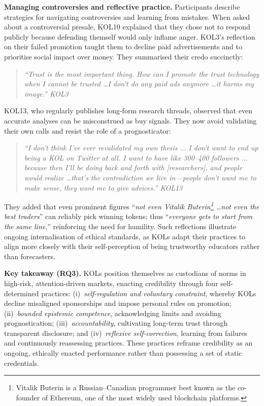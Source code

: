 \noindent\textbf{Managing controversies and reflective practice.} Participants describe strategies for navigating controversies and learning from mistakes.  When asked about a controversial presale, KOL10 explained that they chose not to respond publicly because defending themself would only inflame anger.  KOL3's reflection on their failed promotion taught them to decline paid advertisements and to prioritise social impact over money.  They summarised their credo succinctly:  
\begin{quote}\itshape
``Trust is the most important thing.  How can I promote the trust technology when I cannot be trusted \ldots I don't do any paid ads anymore \ldots it harms my image.''  \textemdash{} KOL3
\end{quote}
KOL13, who regularly publishes long-form research threads, observed that even accurate analyses can be misconstrued as buy signals.  They now avoid validating their own calls and resist the role of a prognosticator:  
\begin{quote}\itshape
``I don't think I've ever revalidated my own thesis $\ldots$ I don't want to end up being a KOL on Twitter at all.  I want to have like 300–400 followers $\ldots$ because then I'll be doing back and forth with [researchers], and people would realize \ldots that's the contradiction we live in---people don't want me to make sense, they want me to give advices.''  \textemdash{} KOL13
\end{quote}
They added that even prominent figures ``\emph{not even Vitalik Buterin\footnote{Vitalik Buterin is a Russian–Canadian programmer best known as the co-founder of Ethereum, one of the most widely used blockchain platforms.} \ldots not even the best traders}'' can reliably pick winning tokens; thus ``\emph{everyone gets to start from the same line},'' reinforcing the need for humility. Such reflections illustrate ongoing internalisation of ethical standards, as KOLs adapt their practices to align more closely with their self-perception of being trustworthy educators rather than forecasters.

\noindent\textbf{Key takeaway (RQ3).} KOLs position themselves as custodians of norms in high-risk, attention-driven markets, enacting credibility through four self-determined practices: (i)~\emph{self-regulation and voluntary constraint}, whereby KOLs decline misaligned sponsorships and impose personal rules on promotion; (ii)~\emph{bounded epistemic competence}, acknowledging limits and avoiding prognostication; (iii)~\emph{accountability}, cultivating long-term trust through transparent disclosure; and (iv)~\emph{reflexive self-correction}, learning from failures and continuously reassessing practices. These practices reframe credibility as an ongoing, ethically enacted performance rather than possessing a set of static credentials.
